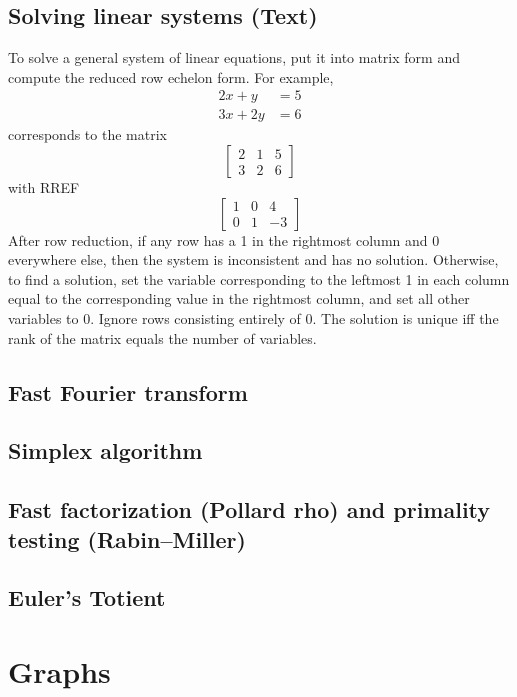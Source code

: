 \documentclass[9pt]{extarticle}
\begin{document}
\begin{multicols}{3}
\subsection{Solving linear systems (Text)}
To solve a general system of linear equations, put it into matrix form and compute the reduced row echelon form. For example,
\begin{align*}2x + y &= 5 \\ 3x + 2y &= 6\end{align*}
corresponds to the matrix
\[ \left[ \begin{array}{cc|c} 2 & 1 & 5 \\ 3 & 2 & 6 \end{array} \right] \]
with RREF
\[ \left[ \begin{array}{cc|c} 1 & 0 & 4 \\ 0 & 1 & -3 \end{array} \right] \]
After row reduction, if any row has a 1 in the rightmost column and 0 everywhere else, then the system is inconsistent and has no solution. Otherwise, to find a solution, set the variable corresponding to the leftmost 1 in each column equal to the corresponding value in the rightmost column, and set all other variables to 0. Ignore rows consisting entirely of 0. The solution is unique iff the rank of the matrix equals the number of variables.

\subsection{Fast Fourier transform}


\subsection{Simplex algorithm}


\subsection{Fast factorization (Pollard rho) and primality testing (Rabin--Miller)}


\subsection{Euler's Totient}


\section{Graphs}


\end{multicols}
\end{document}
